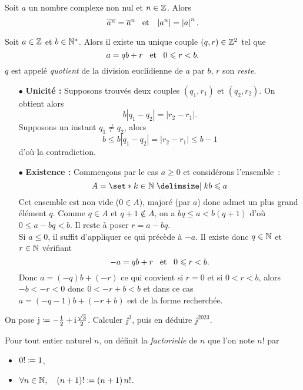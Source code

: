 \documentclass{magnolia}
\begin{document}
\begin{proposition}
Soit $a$ un nombre complexe non nul et $n\in\mathbb{Z}$. Alors
\[\overline{a^n}=\overline{a}^n \quad\!\text{et}\quad\! \left|a^n\right|=\left|a\right|^n.\]
\end{proposition}

\begin{definition}[nom={Division euclidienne}]
Soit $a\in\mathbb{Z}$ et $b\in{\mathbb{N}^*}$. Alors il existe un unique couple $\left(q,r\right)\in\mathbb{Z}^2$
tel que
\[a=qb+r \quad\!\text{et}\quad\! 0\leqslant r<b.\]
$q$ est appelé \emph{quotient} de la division euclidienne de $a$ par $b$, $r$ son
\emph{reste}.
\end{definition}

\begin{preuve}
\begin{itemize}
\item[$\bullet$] \textbf{Unicité :} Supposons trouvés deux couples $(q_1,r_1)$ et $(q_2,r_2)$. On obtient alors $$b|q_1-q_2|=|r_2-r_1|.$$ Supposons un instant $q_1\neq q_2$, alors $$b\leq b|q_1-q_2|=|r_2-r_1|\leq b-1$$ d'où la contradiction.
\item[$\bullet$] \textbf{Existence :} Commençons par le cas $a\geq 0$ et considérons l'ensemble~:
\[A=\enstq{k\in\N}{kb\leq a}\]
Cet ensemble est non vide ($0\in A$), majoré (par $a$) donc admet un plus grand
élément $q$. Comme $q\in A$ et $q+1 \notin A$, on a $bq\leq a <b(q+1)$ d'où $0\leq a-bq<b$. Il reste à poser $r=a-bq$.\\
Si $a\leq 0$, il suffit d'appliquer ce qui précède à $-a$. Il existe donc $q\in \mathbb{N}$ et $r\in \mathbb{N}$ vérifiant \[-a=qb+r \quad\!\text{et}\quad\! 0\leqslant r<b.\]
Donc $a=(-q)b+(-r)$ ce qui convient si $r=0$ et si $0<r<b$, alors $-b<-r<0$ donc $0<-r+b<b$ et dans ce cas $a=(-q-1)b+(-r+b)$ est de la forme recherchée.
\end{itemize}
\end{preuve}

\begin{exoUnique}
\exo On pose ${\rm j}\coloneqq-\frac{1}{2}+{\rm i}\frac{\sqrt{3}}{2}$. Calculer $\jj^3$, puis en déduire
  $\jj^{2023}$.
\end{exoUnique}
  

\begin{definition}[utile=-3]
Pour tout entier naturel $n$, on définit la \emph{factorielle} de $n$ que l'on note
$n!$ par
\begin{itemize}
\item $0!\coloneqq 1$,
\item $\forall n\in\mathbb{N} ,\quad \left(n+1\right)!\coloneqq\left(n+1\right)n!$.
\end{itemize}
\end{definition}
\end{document}
